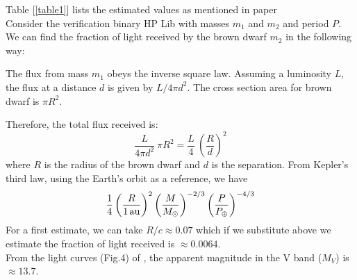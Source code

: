 \documentclass[10pt,a4paper]{article}
\begin{document}
Table [\ref{table1}] lists the estimated values as mentioned in paper \cite{Roelofs}\\



Consider the verification binary HP Lib with masses $m_1$ and $m_2$
and period $P$. We can find the fraction of light received by the
brown dwarf $m_2$ in the following way:

The flux from mass $m_1$ obeys the inverse square law. Assuming a
luminosity $L$, the flux at a distance $d$ is given by $L/4 \pi
d^2$. The cross section area for brown dwarf is $\pi R^2$.

Therefore, the total flux received is:
\begin{equation}
\frac{L}{4 \pi d^2} \ \pi R^2 = \frac{L}{4} \ \left(\frac{R}{d}\right)^2
\end{equation}
where $R$ is the radius of the brown dwarf and $d$ is the separation.
From Kepler's third law, using the Earth's orbit as a reference, we have
\begin{equation}
  \frac{1}{4} \left(\frac{R}{\rm 1\,au}\right)^2
  \left(\frac{M}{M_{\odot}}\right)^{-2/3}
  \left(\frac{P}{P_{\oplus}}\right)^{-4/3}
\end{equation}
For a first estimate, we can take $R/c \approx 0.07$ which if we
substitute above we estimate the fraction of light received is
$\approx 0.0064$.\\

From the light curves (Fig.4) of \citep{Patterson}, the apparent magnitude in the V band ($M_V$) is $\approx 13.7$.



\end{document}
